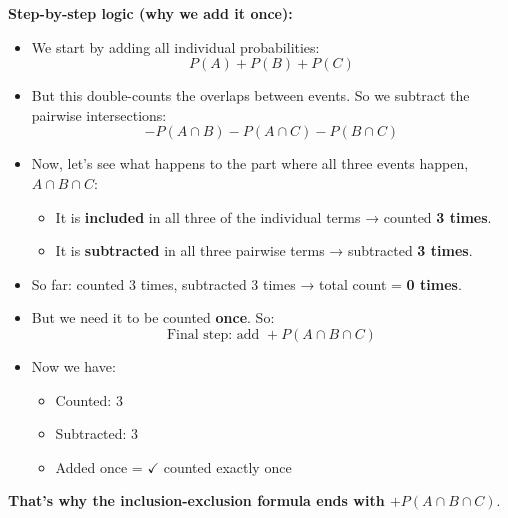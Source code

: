 \documentclass{article}
\begin{document}
\textbf{Step-by-step logic (why we add it once):}
\begin{itemize}
    \item We start by adding all individual probabilities:
    \[
    P(A) + P(B) + P(C)
    \]
    \item But this double-counts the overlaps between events. So we subtract the pairwise intersections:
    \[
    - P(A \cap B) - P(A \cap C) - P(B \cap C)
    \]
    \item Now, let’s see what happens to the part where all three events happen,  \( A \cap B \cap C \):
    \begin{itemize}
        \item It is \textbf{included} in all three of the individual terms → counted \textbf{3 times}.
        \item It is \textbf{subtracted} in all three pairwise terms → subtracted \textbf{3 times}.
    \end{itemize}
    \item So far: counted 3 times, subtracted 3 times → total count = \textbf{0 times}.
    \item But we need it to be counted \textbf{once}. So:
    \[
    \text{Final step: add } + P(A \cap B \cap C)
    \]
    \item Now we have:
    \begin{itemize}
        \item Counted: 3
        \item Subtracted: 3
        \item Added once = $\checkmark$ counted exactly once
    \end{itemize}
\end{itemize}

\textbf{That’s why the inclusion-exclusion formula ends with \( + P(A \cap B \cap C) \)}.
\end{document}
